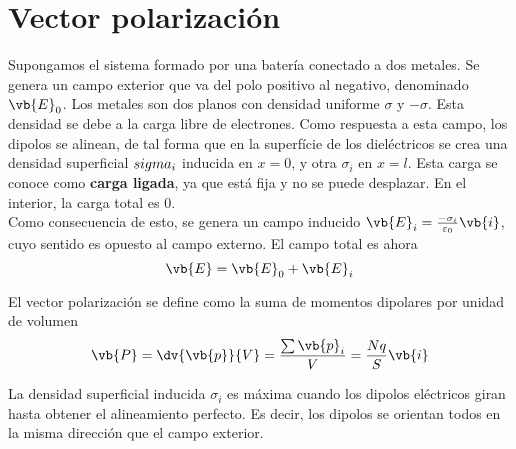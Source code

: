 \documentclass{./FisicaII.tex}
\begin{document}
\section{Vector polarización}
Supongamos el sistema formado por una batería conectado a dos metales. Se genera un campo
exterior que va del polo positivo al negativo, denominado \(\vb{E}_{0}\). Los metales son
dos planos con densidad uniforme \(\sigma \) y \(-\sigma \). Esta densidad se debe a la
carga libre de electrones. Como respuesta a esta campo, los dipolos se alinean, de tal
forma que en la superfície de los dieléctricos se crea una densidad superficial
\(\-sigma _{i}\) inducida en \(x=0\), y otra \(\sigma _{i}\) en \(x=l\). Esta carga se
conoce como \textbf{carga ligada}, ya que está fija y no se puede desplazar. En el
interior, la carga total es \(0\).\\
Como consecuencia de esto, se genera un campo inducido \(\vb{E}_i = \frac{-\sigma _{i}}{\varepsilon _{0}} \vb{i}\), cuyo sentido es
opuesto al campo externo. El campo total es ahora
\[
	\vb{E} = \vb{E}_0 + \vb{E}_i
\]
\begin{defin}
	El vector polarización se define como la suma de momentos dipolares por unidad de volumen
	\begin{equation}
		\begin{split}
			\vb{P} = \dv{\vb{p}}{V} = \frac{\sum \vb{p}_i}{V} = \frac{Nq}{S} \vb{i}
		\end{split}
	\end{equation}
\end{defin}
La densidad superficial inducida \(\sigma _{i}\) es máxima cuando los dipolos eléctricos
giran hasta obtener el alineamiento perfecto. Es decir, los dipolos se orientan todos
en la misma dirección que el campo exterior.
\end{document}
